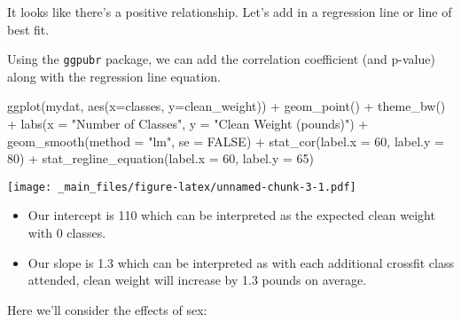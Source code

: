 \documentclass[
]{book}
\newenvironment{Shaded}{\begin{snugshade}}{\end{snugshade}}
\newcommand{\AttributeTok}[1]{\textcolor[rgb]{0.77,0.63,0.00}{#1}}
\newcommand{\ConstantTok}[1]{\textcolor[rgb]{0.00,0.00,0.00}{#1}}
\newcommand{\DecValTok}[1]{\textcolor[rgb]{0.00,0.00,0.81}{#1}}
\newcommand{\FunctionTok}[1]{\textcolor[rgb]{0.00,0.00,0.00}{#1}}
\newcommand{\NormalTok}[1]{#1}
\newcommand{\SpecialCharTok}[1]{\textcolor[rgb]{0.00,0.00,0.00}{#1}}
\newcommand{\StringTok}[1]{\textcolor[rgb]{0.31,0.60,0.02}{#1}}
\providecommand{\tightlist}{%
  \setlength{\itemsep}{0pt}\setlength{\parskip}{0pt}}
\begin{document}
It looks like there's a positive relationship. Let's add in a regression line or line of best fit.

Using the \texttt{ggpubr} package, we can add the correlation coefficient (and p-value) along with the regression line equation.

\begin{Shaded}
\begin{Highlighting}[]
\FunctionTok{ggplot}\NormalTok{(mydat, }\FunctionTok{aes}\NormalTok{(}\AttributeTok{x=}\NormalTok{classes, }\AttributeTok{y=}\NormalTok{clean\_weight)) }\SpecialCharTok{+}
  \FunctionTok{geom\_point}\NormalTok{() }\SpecialCharTok{+}
  \FunctionTok{theme\_bw}\NormalTok{() }\SpecialCharTok{+}
  \FunctionTok{labs}\NormalTok{(}\AttributeTok{x =} \StringTok{"Number of Classes"}\NormalTok{, }\AttributeTok{y =} \StringTok{"Clean Weight (pounds)"}\NormalTok{) }\SpecialCharTok{+}
  \FunctionTok{geom\_smooth}\NormalTok{(}\AttributeTok{method =} \StringTok{"lm"}\NormalTok{, }\AttributeTok{se =} \ConstantTok{FALSE}\NormalTok{)  }\SpecialCharTok{+}
  \FunctionTok{stat\_cor}\NormalTok{(}\AttributeTok{label.x =} \DecValTok{60}\NormalTok{, }\AttributeTok{label.y =} \DecValTok{80}\NormalTok{) }\SpecialCharTok{+}
  \FunctionTok{stat\_regline\_equation}\NormalTok{(}\AttributeTok{label.x =} \DecValTok{60}\NormalTok{, }\AttributeTok{label.y =} \DecValTok{65}\NormalTok{) }
\end{Highlighting}
\end{Shaded}

\texttt{[image: \_main\_files/figure-latex/unnamed-chunk-3-1.pdf]}

\begin{itemize}
\tightlist
\item
  Our intercept is 110 which can be interpreted as the expected clean weight with 0 classes.
\item
  Our slope is 1.3 which can be interpreted as with each additional crossfit class attended, clean weight will increase by 1.3 pounds on average.
\end{itemize}

Here we'll consider the effects of sex:
\end{document}
